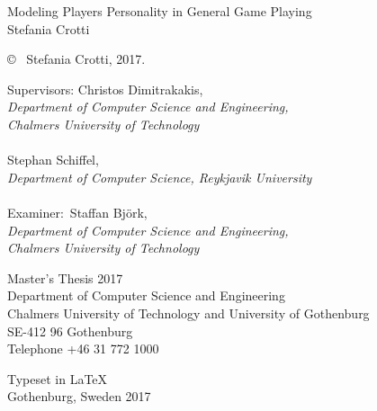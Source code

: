 \newpage
\thispagestyle{plain}
\vspace*{4.5cm}
Modeling Players Personality in General Game Playing\\
Stefania Crotti \setlength{\parskip}{1cm}

\copyright ~ Stefania Crotti, 2017. \setlength{\parskip}{1cm}

Supervisors: Christos Dimitrakakis,\\
\hspace*{13ex}\emph{Department of Computer Science and Engineering,\\
\hspace*{13ex}Chalmers University of Technology}\\
\\
\hspace*{13ex}Stephan Schiffel,\\
\hspace*{13ex}\emph{Department of Computer Science, Reykjavik University}\\
\\
Examiner:\quad \ Staffan Björk,\\
\hspace*{13ex}\emph{Department of Computer Science and Engineering,\\
\hspace*{13ex}Chalmers University of Technology}\setlength{\parskip}{1cm}

Master's Thesis 2017\\	%
Department of Computer Science and Engineering\\
Chalmers University of Technology and University of Gothenburg\\
SE-412 96 Gothenburg\\
Telephone +46 31 772 1000 \setlength{\parskip}{0.5cm}

Typeset in \LaTeX \\
Gothenburg, Sweden 2017

